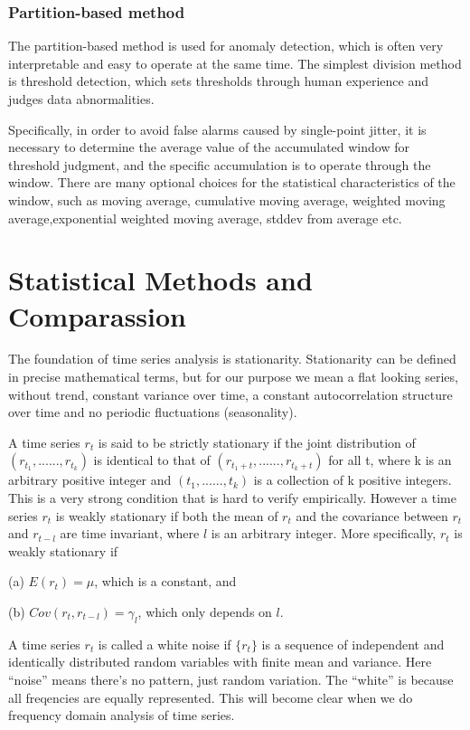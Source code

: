 \subsubsection{Partition-based method}
The partition-based method is used for anomaly detection, which is often very interpretable and easy to operate at the same time. The simplest division method is threshold detection, which sets thresholds through human experience and judges data abnormalities.

Specifically, in order to avoid false alarms caused by single-point jitter, it is necessary to determine the average value of the accumulated window for threshold judgment, and the specific accumulation is to operate through the window. There are many optional choices for the statistical characteristics of the window, such as moving average, cumulative moving average, weighted moving average,exponential weighted moving average, stddev from average etc. 

\section{Statistical Methods and Comparassion}
The foundation of time series analysis is stationarity. Stationarity can be defined in precise mathematical terms, but for our purpose we mean a flat looking series, without trend, constant variance over time, a constant autocorrelation structure over time and no periodic fluctuations (seasonality).


A time series ${r_t}$ is said to be strictly stationary if the joint distribution of $(r_{t_1}, . . . . . ., r_{t_k})$ is identical to that of $(r_{t_1 + t} , . . . . . ., r_{t_{k}+t})$ for all t, where k is an arbitrary positive integer and $(t_1, . . . . . . , t_k)$ is a collection of k positive integers. This is a very strong condition that is hard to verify empirically. However a time series ${r_t}$ is weakly stationary if both the mean of $r_t$ and the covariance between $r_t$ and $r_{t-l}$ are time invariant, where $l$ is an arbitrary integer. More specifically, ${r_t}$ is weakly stationary if

(a) $E(r_t) = \mu$, which is a constant, and

(b) $Cov( r_t ,  r_{t-l} ) = \gamma_{l} $, which only depends on $l$.

A time series $r_t$ is called a white noise if $\{r_t\}$ is a sequence of independent and identically distributed random variables with finite mean and variance. Here “noise” means there’s no pattern, just random variation. The “white” is because all freqencies are equally represented. This will become clear when we do frequency domain analysis of time series.

